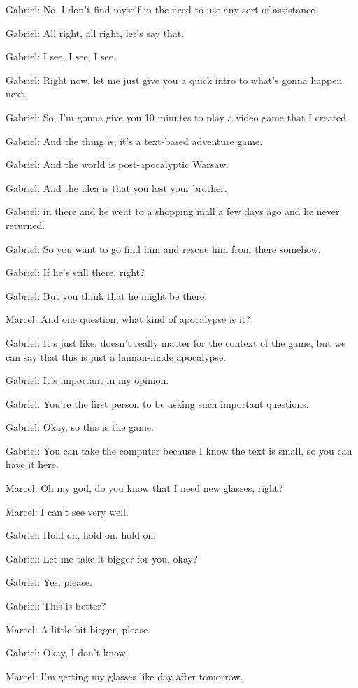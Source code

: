 Gabriel: No, I don't find myself in the need to use any sort of assistance.

Gabriel: All right, all right, let's say that.

Gabriel: I see, I see, I see.

Gabriel: Right now, let me just give you a quick intro to what's gonna happen next.

Gabriel: So, I'm gonna give you 10 minutes to play a video game that I created.

Gabriel: And the thing is, it's a text-based adventure game.

Gabriel: And the world is post-apocalyptic Warsaw.

Gabriel: And the idea is that you lost your brother.

Gabriel: in there and he went to a shopping mall a few days ago and he never returned.

Gabriel: So you want to go find him and rescue him from there somehow.

Gabriel: If he's still there, right?

Gabriel: But you think that he might be there.

Marcel: And one question, what kind of apocalypse is it?

Gabriel: It's just like, doesn't really matter for the context of the game, but we can say that this is just a human-made apocalypse.

Gabriel: It's important in my opinion.

Gabriel: You're the first person to be asking such important questions.

Gabriel: Okay, so this is the game.

Gabriel: You can take the computer because I know the text is small, so you can have it here.

Marcel: Oh my god, do you know that I need new glasses, right?

Marcel: I can't see very well.

Gabriel: Hold on, hold on, hold on.

Gabriel: Let me take it bigger for you, okay?

Gabriel: Yes, please.

Gabriel: This is better?

Marcel: A little bit bigger, please.

Gabriel: Okay, I don't know.

Marcel: I'm getting my glasses like day after tomorrow.

